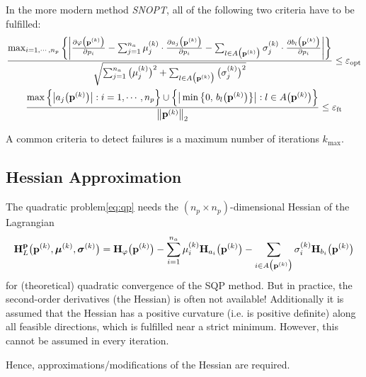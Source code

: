 			In the more modern method \emph{SNOPT}, all of the following two criteria have to be fulfilled:
			\begin{gather*}
				\frac{
					\max_{i = 1, \cdots, n_p} \bigg\{ \bigg\lvert \pdv{\varphi\big(\boldsymbol{\mathrm{p}}^{(k)}\big)}{p_i} - \sum_{j = 1}^{n_a} \mu_j^{(k)} \cdot \pdv{a_j\big(\boldsymbol{\mathrm{p}}^{(k)}\big)}{p_i} - \sum_{l \in A\big(\boldsymbol{\mathrm{p}}^{(k)}\big)} \sigma_j^{(k)} \cdot \pdv{b_l\big(\boldsymbol{\mathrm{p}}^{(k)}\big)}{p_i} \bigg\rvert \bigg\}
				}{
					\sqrt{\sum_{j = 1}^{n_a} \big( \mu_j^{(k)} \big)^2 + \sum_{l \in A\big(\boldsymbol{\mathrm{p}}^{(k)}\big)} \big(\sigma_j^{(k)}\big)^2}
				} \leq \varepsilon_\mathrm{opt} \\
				\frac{\max\Big\{ \big\lvert a_j\big(\boldsymbol{\mathrm{p}}^{(k)}\big) \big\rvert : i = 1, \cdots, n_p \Big\} \cup \Big\{ \big\lvert \min\big\{ 0,\, b_l\big(\boldsymbol{\mathrm{p}}^{(k)}\big) \big\} \big\rvert : l \in A\big(\boldsymbol{\mathrm{p}}^{(k)}\big) \Big\}}{\big\lVert \boldsymbol{\mathrm{p}}^{(k)} \big\rVert_2} \leq \varepsilon_\mathrm{ft}
			\end{gather*}
			
			A common criteria to detect failures is a maximum number of iterations \( k_\mathrm{max} \).

		\subsection{Hessian Approximation}
			The quadratic problem\eqref{eq:qp} needs the \( (n_p \times n_p) \)-dimensional Hessian of the Lagrangian
			\begin{align*}
				\boldsymbol{\mathrm{H}}_L^{\boldsymbol{\mathrm{p}}}\big(\boldsymbol{\mathrm{p}}^{(k)}, \boldsymbol{\mathrm{\mu}}^{(k)}, \boldsymbol{\mathrm{\sigma}}^{(k)}\big) = \boldsymbol{\mathrm{H}}_\varphi\big(\boldsymbol{\mathrm{p}}^{(k)}\big) - \sum_{i = 1}^{n_a} \mu_i^{(k)} \boldsymbol{\mathrm{H}}_{a_i}\big(\boldsymbol{\mathrm{p}}^{(k)}\big) - \sum_{i \in A\big(\boldsymbol{\mathrm{p}}^{(k)}\big)} \sigma_i^{(k)} \boldsymbol{\mathrm{H}}_{b_i}\big(\boldsymbol{\mathrm{p}}^{(k)}\big)
			\end{align*}
			for (theoretical) quadratic convergence of the SQP method. But in practice, the second-order derivatives (the Hessian) is often not available! Additionally it is assumed that the Hessian has a positive curvature (i.e. is positive definite) along all feasible directions, which is fulfilled near a strict minimum. However, this cannot be assumed in every iteration.
			
			Hence, approximations/modifications of the Hessian are required.

